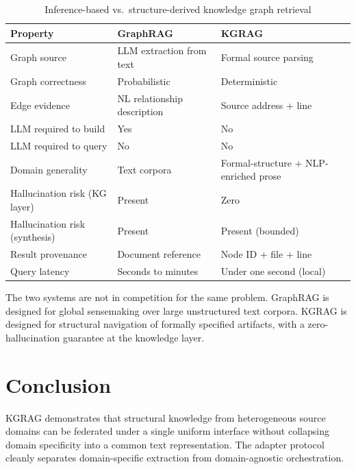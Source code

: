 \documentclass[10pt]{article}
\begin{document}
\begin{table}[h]
\centering
\caption{Inference-based vs.\ structure-derived knowledge graph retrieval}
\label{tab:comparison}
\begin{tabular}{lll}
\toprule
Property & GraphRAG~\cite{edge2024graphrag} & KGRAG \\
\midrule
Graph source        & LLM extraction from text      & Formal source parsing \\
Graph correctness   & Probabilistic                 & Deterministic \\
Edge evidence       & NL relationship description   & Source address + line \\
LLM required to build  & Yes                        & No \\
LLM required to query  & No                         & No \\
Domain generality   & Text corpora                  & Formal-structure + NLP-enriched prose \\
Hallucination risk (KG layer) & Present             & Zero \\
Hallucination risk (synthesis) & Present            & Present (bounded) \\
Result provenance   & Document reference            & Node ID + file + line \\
Query latency       & Seconds to minutes            & Under one second (local) \\
\bottomrule
\end{tabular}
\end{table}

The two systems are not in competition for the same problem. GraphRAG is
designed for global sensemaking over large unstructured text corpora. KGRAG
is designed for structural navigation of formally specified artifacts, with a
zero-hallucination guarantee at the knowledge layer.

\section{Conclusion}

KGRAG demonstrates that structural knowledge from heterogeneous source domains
can be federated under a single uniform interface without collapsing domain
specificity into a common text representation. The adapter protocol cleanly
separates domain-specific extraction from domain-agnostic orchestration.
\end{document}
